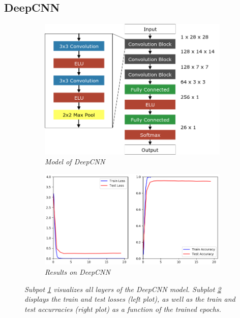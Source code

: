 \documentclass[a4paper]{article}
\begin{document}
\subsection{DeepCNN}\label{sec:deepCNN}

\begin{figure}
    \centering
    \hspace{-1cm}
    \begin{subfigure}[b]{0.4\textwidth}
        \includegraphics[height=0.25\paperwidth]{graphics/nets/CNN13}
        \caption{\textit{Model of DeepCNN}}
        \label{fig:deepCNN_model}
    \end{subfigure}
    \begin{subfigure}[b]{0.5\textwidth}
        \includegraphics[height=0.25\paperwidth]{graphics/nets/CNN13_Results}
        \caption{\textit{Results on DeepCNN}}
        \label{fig:deepCNN_results}
    \end{subfigure}
    \caption{\textit{Subpot \ref{fig:deepCNN_model} visualizes all layers of the DeepCNN model. Subplot \ref{fig:deepCNN_results} displays the train and test losses (left plot), as well as the train and test accurracies (right plot) as a function of the trained epochs.}}\label{fig:deepCNN}
\end{figure}
\end{document}
